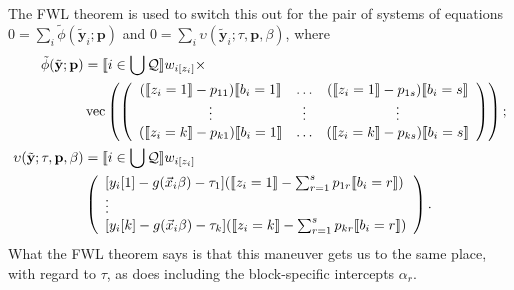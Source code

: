 \documentclass{article}
\DeclarePairedDelimiter{\indicator}{\llbracket}{\rrbracket}
\newcommand{\owt}[1][z_i]{\ensuremath{w_{i[#1]}}}
\begin{document}
The FWL theorem is used to switch this out for the pair of systems of
equations $0 = \sum_{i}\tilde{\phi}(\tilde{\mathbf{y}}_{i}; \mathbf{p})$ and
$0= \sum_{i}\upsilon(\tilde{\mathbf{y}}_{i}; \tau, \mathbf{p},
\beta)$,  where
\begin{align}
  \tilde{\phi}(\tilde{\mathbf{y}}; \mathbf{p}) &=
                                                 \indicator{i \in \bigcup \mathcal{Q}} \owt{} \times \nonumber \\
  &\operatorname{vec}\left(%
                                                 \left(
                                                 \begin{array}{ccc}
                                                   (\indicator{z_{i}=1}-p_{11})\indicator{b_{i}=1}&\ldots&(\indicator{z_{i}=1}-p_{1s})\indicator{b_{i}=s}
                                                   \\
                                                   \vdots & \vdots &
                                                                     \vdots
                                                   \\
                                                   (\indicator{z_{i}=k}-p_{k1})\indicator{b_{i}=1}&\ldots&(\indicator{z_{i}=k}-p_{ks})\indicator{b_{i}=s}\\                                                   
                                                 \end{array}
  \right)%
  \right) ;\nonumber \\
  \upsilon(\tilde{\mathbf{y}}; \tau, \mathbf{p}, \beta) &=
\indicator{i \in \bigcup \mathcal{Q}}\owt{} \nonumber \\
&\left(
                                             \begin{array}{l}                                               
           [y_{i}[1]
                                               -
                                               g(\vec{x}_{i}\beta)-\tau_{1}](
                                               \indicator{z_{i}=1} - \sum_{r=1}^{s}p_{1r}\indicator{b_{i}=r})\\
                  \vdots \\
{}           [y_{i}[k]
                                               - g(\vec{x}_{i}\beta) -
                                               \tau_{k}](\indicator{z_{i}=k}
                                               - \sum_{r=1}^{s}p_{kr}\indicator{b_{i}=r})\\                                             \end{array}
\right) . \label{eq:upsilondef}
\end{align}
What the FWL theorem says is that this maneuver gets us to the same
place, with regard to $\tau$, as does including the block-specific
intercepts $\alpha_{r}$.
\end{document}
